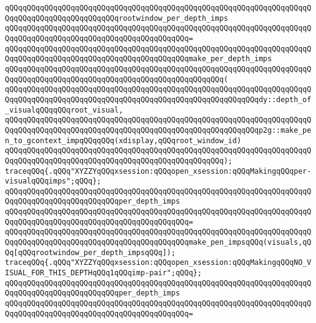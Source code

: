 \verb|qQQqqQQqqQQqqQQqqQQqqQQqqQQqqQQqqQQqqQQqqQQqqQQqqQQqqQQqqQQqqQQqqQQqqQQqqQQqqQQqqQQqqQQqqQQqqQQqrootwindow_per_depth_imps|\newline
\verb|qQQqqQQqqQQqqQQqqQQqqQQqqQQqqQQqqQQqqQQqqQQqqQQqqQQqqQQqqQQqqQQqqQQqqQQqqQQqqQQqqQQqqQQqqQQqqQQqqQQqqQQqqQQqqQQq=|\newline
\verb|qQQqqQQqqQQqqQQqqQQqqQQqqQQqqQQqqQQqqQQqqQQqqQQqqQQqqQQqqQQqqQQqqQQqqQQqqQQqqQQqqQQqqQQqqQQqqQQqqQQqqQQqqQQqqQQqmake_per_depth_imps|\newline
\verb|qQQqqQQqqQQqqQQqqQQqqQQqqQQqqQQqqQQqqQQqqQQqqQQqqQQqqQQqqQQqqQQqqQQqqQQqqQQqqQQqqQQqqQQqqQQqqQQqqQQqqQQqqQQqqQQqqQQqqQQq(|\newline
\verb|qQQqqQQqqQQqqQQqqQQqqQQqqQQqqQQqqQQqqQQqqQQqqQQqqQQqqQQqqQQqqQQqqQQqqQQqqQQqqQQqqQQqqQQqqQQqqQQqqQQqqQQqqQQqqQQqqQQqqQQqqQQqqQQqdy::depth_of_visualqQQqqQQqroot_visual,|\newline
\verb|qQQqqQQqqQQqqQQqqQQqqQQqqQQqqQQqqQQqqQQqqQQqqQQqqQQqqQQqqQQqqQQqqQQqqQQqqQQqqQQqqQQqqQQqqQQqqQQqqQQqqQQqqQQqqQQqqQQqqQQqqQQqqQQqp2g::make_pen_to_gcontext_impqQQqqQQq(xdisplay,qQQqroot_window_id)|\newline
\verb|qQQqqQQqqQQqqQQqqQQqqQQqqQQqqQQqqQQqqQQqqQQqqQQqqQQqqQQqqQQqqQQqqQQqqQQqqQQqqQQqqQQqqQQqqQQqqQQqqQQqqQQqqQQqqQQqqQQqqQQq);|\newline
\newline
\verb|traceqQQq{.qQQq"XYZZYqQQqxsession:qQQqopen_xsession:qQQqMakingqQQqper-visualqQQqimps";qQQq};|\newline
\verb|qQQqqQQqqQQqqQQqqQQqqQQqqQQqqQQqqQQqqQQqqQQqqQQqqQQqqQQqqQQqqQQqqQQqqQQqqQQqqQQqqQQqqQQqqQQqqQQqper_depth_imps|\newline
\verb|qQQqqQQqqQQqqQQqqQQqqQQqqQQqqQQqqQQqqQQqqQQqqQQqqQQqqQQqqQQqqQQqqQQqqQQqqQQqqQQqqQQqqQQqqQQqqQQqqQQqqQQqqQQqqQQq=|\newline
\verb|qQQqqQQqqQQqqQQqqQQqqQQqqQQqqQQqqQQqqQQqqQQqqQQqqQQqqQQqqQQqqQQqqQQqqQQqqQQqqQQqqQQqqQQqqQQqqQQqqQQqqQQqqQQqqQQqmake_pen_impsqQQq(visuals,qQQq[qQQqrootwindow_per_depth_impsqQQq]);|\newline
\newline
\verb|traceqQQq{.qQQq"XYZZYqQQqxsession:qQQqopen_xsession:qQQqMakingqQQqNO_VISUAL_FOR_THIS_DEPTHqQQq1qQQqimp-pair";qQQq};|\newline
\verb|qQQqqQQqqQQqqQQqqQQqqQQqqQQqqQQqqQQqqQQqqQQqqQQqqQQqqQQqqQQqqQQqqQQqqQQqqQQqqQQqqQQqqQQqqQQqqQQqper_depth_imps|\newline
\verb|qQQqqQQqqQQqqQQqqQQqqQQqqQQqqQQqqQQqqQQqqQQqqQQqqQQqqQQqqQQqqQQqqQQqqQQqqQQqqQQqqQQqqQQqqQQqqQQqqQQqqQQqqQQqqQQq=|\newline
